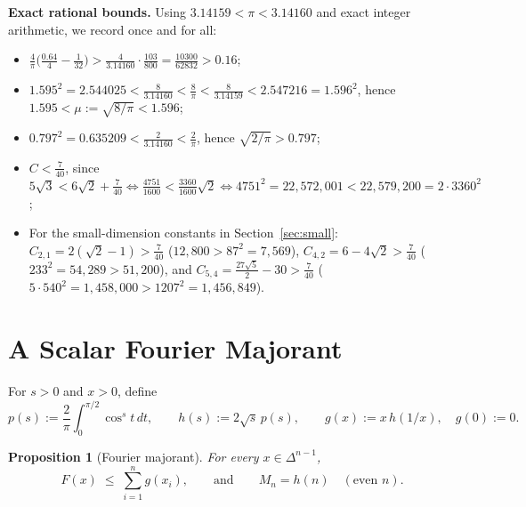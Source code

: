 \documentclass[11pt]{article}
\theoremstyle{plain}
\newtheorem{proposition}[theorem]{Proposition}
\theoremstyle{definition}
\theoremstyle{remark}
\begin{document}
\noindent\textbf{Exact rational bounds.}
Using $3.14159 < \pi < 3.14160$ and exact integer arithmetic, we record once and for all:
\begin{itemize}[leftmargin=1.5em,itemsep=2pt]
\item $\frac{4}{\pi}\bigl(\frac{0.64}{4} - \frac{1}{32}\bigr) > \frac{4}{3.14160}\cdot\frac{103}{800} = \frac{10300}{62832} > 0.16$;
\item $1.595^2 = 2.544025 < \frac{8}{3.14160} < \frac{8}{\pi} < \frac{8}{3.14159} < 2.547216 = 1.596^2$, hence $1.595 < \mu := \sqrt{8/\pi} < 1.596$;
\item $0.797^2 = 0.635209 < \frac{2}{3.14160} < \frac{2}{\pi}$, hence $\sqrt{2/\pi} > 0.797$;
\item $C < \frac{7}{40}$, since $5\sqrt{3} < 6\sqrt{2} + \frac{7}{40} \iff \frac{4751}{1600} < \frac{3360}{1600}\sqrt{2} \iff 4751^2 = 22{,}572{,}001 < 22{,}579{,}200 = 2 \cdot 3360^2$;
\item For the small-dimension constants in Section~\ref{sec:small}: $C_{2,1} = 2(\sqrt{2}-1) > \frac{7}{40}$ ($12{,}800 > 87^2 = 7{,}569$), $C_{4,2} = 6 - 4\sqrt{2} > \frac{7}{40}$ ($233^2 = 54{,}289 > 51{,}200$), and $C_{5,4} = \frac{27\sqrt{5}}{2} - 30 > \frac{7}{40}$ ($5 \cdot 540^2 = 1{,}458{,}000 > 1207^2 = 1{,}456{,}849$).
\end{itemize}

\section{A Scalar Fourier Majorant}

For $s > 0$ and $x > 0$, define
\[
p(s) := \frac{2}{\pi}\int_0^{\pi/2} \cos^s t\,dt, \qquad
h(s) := 2\sqrt{s}\,p(s), \qquad
g(x) := x\,h(1/x), \quad g(0) := 0.
\]

\begin{proposition}[Fourier majorant]\label{prop:fourier}
For every $x \in \Delta^{n-1}$,
\begin{equation}\label{eq:majorant}
F(x) \;\le\; \sum_{i=1}^n g(x_i), \qquad\text{and}\qquad M_n = h(n) \quad (\text{even } n).
\end{equation}
\end{proposition}
\end{document}
